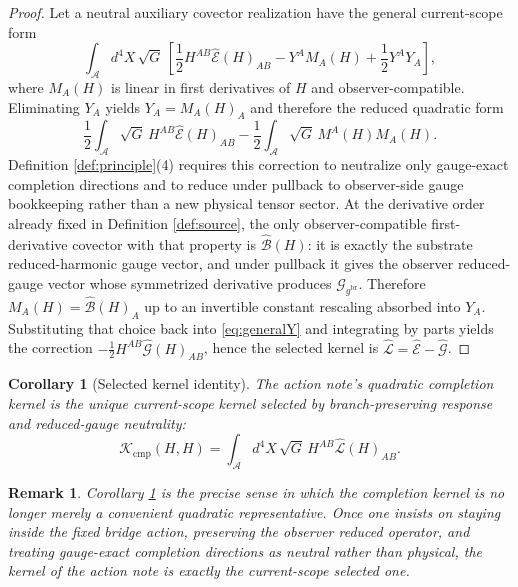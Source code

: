 \documentclass[11pt]{article}
\newcommand{\Sub}{\mathcal A}
\newcommand{\ObserverMetric}{g^{\mathrm{br}}}
\newcommand{\SubEinLin}{\widehat{\mathcal E}}
\newcommand{\SubGaugeVec}{\widehat{\mathcal B}}
\newcommand{\SubGaugeBook}{\widehat{\mathcal G}}
\newcommand{\SubReducedEin}{\widehat{\mathcal L}}
\newcommand{\GaugeAux}{Y}
\newcommand{\GaugeBook}{\mathcal G_{\ObserverMetric}}
\newcommand{\CompKernel}{\mathscr K_{\mathrm{cmp}}}
\newtheorem{remark}{Remark}
\newtheorem{corollary}{Corollary}
\begin{document}
\begin{proof}
Let a neutral auxiliary covector realization have the general current-scope form
\begin{equation}
\int_{\Sub} d^4X\,\sqrt{G}\,
\left[
\frac12 H^{AB}\SubEinLin(H)_{AB}
-\GaugeAux^A M_A(H)
+\frac12 \GaugeAux^A\GaugeAux_A
\right],
\label{eq:generalY}
\end{equation}
where \(M_A(H)\) is linear in first derivatives of \(H\) and observer-compatible. Eliminating \(\GaugeAux_A\) yields \(\GaugeAux_A=M_A(H)_A\) and therefore the reduced quadratic form
\[
\frac12
\int_{\Sub}\sqrt{G}\,
H^{AB}\SubEinLin(H)_{AB}
-\frac12
\int_{\Sub}\sqrt{G}\,M^A(H)M_A(H).
\]
Definition \ref{def:principle}(4) requires this correction to neutralize only gauge-exact completion directions and to reduce under pullback to observer-side gauge bookkeeping rather than a new physical tensor sector. At the derivative order already fixed in Definition \ref{def:source}, the only observer-compatible first-derivative covector with that property is \(\SubGaugeVec(H)\): it is exactly the substrate reduced-harmonic gauge vector, and under pullback it gives the observer reduced-gauge vector whose symmetrized derivative produces \(\GaugeBook\). Therefore \(M_A(H)=\SubGaugeVec(H)_A\) up to an invertible constant rescaling absorbed into \(\GaugeAux_A\). Substituting that choice back into \eqref{eq:generalY} and integrating by parts yields the correction \(-\frac12 H^{AB}\SubGaugeBook(H)_{AB}\), hence the selected kernel is \(\SubReducedEin=\SubEinLin-\SubGaugeBook\).
\end{proof}

\begin{corollary}[Selected kernel identity]
\label{cor:kernel}
The action note's quadratic completion kernel is the unique current-scope kernel selected by branch-preserving response and reduced-gauge neutrality:
\begin{equation}
\CompKernel(H,H)
=
\int_{\Sub} d^4X\,\sqrt{G}\,
H^{AB}\SubReducedEin(H)_{AB}.
\label{eq:kerneldiag}
\end{equation}
\end{corollary}

\begin{remark}
Corollary \ref{cor:kernel} is the precise sense in which the completion kernel is no longer merely a convenient quadratic representative. Once one insists on staying inside the fixed bridge action, preserving the observer reduced operator, and treating gauge-exact completion directions as neutral rather than physical, the kernel of the action note is exactly the current-scope selected one.
\end{remark}
\end{document}
